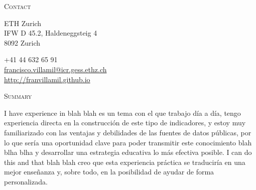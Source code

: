 \documentclass[a4paper, 10pt]{article}
\begin{document}


\noindent
\begin{minipage}[t]{0.13\textwidth}
	\flushleft
  \textsc{\footnotesize Contact}
\end{minipage}
\begin{minipage}[t]{0.87\textwidth}
	\begin{minipage}[t]{0.5\textwidth}
		ETH Zurich\\
		IFW D 45.2, Haldeneggsteig 4\\
		8092 Zurich\\
	\end{minipage}
	\begin{minipage}[t]{0.45\textwidth}
		 \hspace{5pt} +41 44 632 65 91\\
		 \hspace{5pt} \href{mailto:francisco.villamil@icr.gess.ethz.ch}{francisco.villamil@icr.gess.ethz.ch}\\
		 \hspace{5pt} \href{http://franvillamil.github.io}{http://franvillamil.github.io}\\
	\end{minipage}
\end{minipage}

\vspace{8pt}



\noindent
\begin{minipage}[t]{0.13\textwidth}
	\flushleft
  \textsc{\footnotesize Summary}
\end{minipage}
\begin{minipage}[t]{0.87\textwidth}
  I have experience in blah blah es un tema con el que trabajo día a día, tengo experiencia directa en la construcción de este tipo de indicadores, y estoy muy familiarizado con las ventajas y debilidades de las fuentes de datos públicas, por lo que sería una oportunidad clave para poder transmitir este conocimiento blah blha blha y desarrollar una estrategia educativa lo más efectiva posible.
  I can do this and that blah blah creo que esta experiencia práctica se traduciría en una mejor enseñanza y, sobre todo, en la posibilidad de ayudar de forma personalizada.
\end{minipage}
\end{document}
